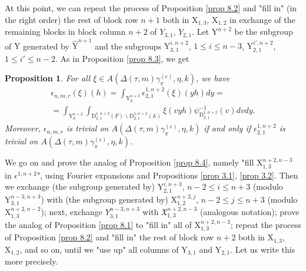 \documentclass[12pts]{amsart}
\newcommand{\BA}{{\mathbb {A}}}
\newtheorem{prop}[thm]{Proposition}
\begin{document}
At this point, we can repeat the process of Proposition \ref{prop
	8.2} and "fill in" (in the right order) the rest of block row $n+1$
both in $\mathrm{X}_{1,3}$, $\mathrm{X}_{1,2}$ in exchange of the
remaining blocks in block column $n+2$ of $Y_{3,1}$, $Y_{2,1}$. Let $\mathrm{Y}^{n+2}$ be the subgroup of $\mathrm{Y}$ generated by $\hat{\mathrm{Y}}^{n+1}$ and the subgroups $\mathrm{Y}_{3,1}^{i,n+2}$, $1\leq i\leq n-3$, $\mathrm{Y}_{2,1}^{i',n+2}$, $1\leq i'\leq n-2$.
As in Proposition \ref{prop 8.3}, we get
\begin{prop}\label{prop 8.3.1}
	For all $\xi\in A(\Delta(\tau,m)\gamma_\pi^{(\epsilon)},\eta,k)$, we have
	\begin{multline}\label{8.27.4}
	\epsilon_{n,m,r}(\xi)(h)=\int_{\mathrm{Y}^{n+2}_\BA}\epsilon_{2,1}^{1,n+2}(\xi)(yh)dy
	=\\
	=\int_{\mathrm{Y}^{n+2}_\BA}\int_{\mathrm{D}_{2,1}^{1,n+2}(F)\backslash \mathrm{D}_{2,1}^{1,n+2}(\BA)}\xi(vyh)\psi^{-1}_{\mathrm{D}_{2,1}^{1,n+2}}(v)dvdy.
	\end{multline}
	Moreover, $\epsilon_{n,m,r}$ is trivial on
	$A(\Delta(\tau,m)\gamma_\pi^{(\epsilon)},\eta,k)$ if and only if $\epsilon_{2,1}^{1,n+2}$ is trivial on 	$A(\Delta(\tau,m)\gamma_\pi^{(\epsilon)},\eta,k)$.
\end{prop}

We go on and prove
the analog of Proposition \ref{prop 8.4}, namely "fill $\mathrm{X}_{1,3}^{n+2,n-3}$ in $\epsilon^{1,n+2}$", using Fourier
expansions and Propositions \ref{prop 3.1}, \ref{prop 3.2}.
Then we exchange (the subgroup
generated by) $\mathrm{Y}_{2,1}^{i,n+3}$, $n-2\leq i\leq n+3$
(modulo $\mathrm{Y}_{3,1}^{n-3,n+3}$) with (the subgroup generated
by) $\mathrm{X}_{1,2}^{n+2,j}$, $n-2\leq j\leq n+3$ (modulo
$\mathrm{X}_{1,3}^{n+2,n-2}$); next, exchange $Y_{3,1}^{n-3,n+3}$ with
$\mathfrak{X}_{1,3}^{n+2,n-3}$ (analogous notation); prove the
analog of Proposition \ref{prop 8.1} to "fill in" all of
$\mathrm{X}_{1,3}^{n+2,n-3}$; repeat the process of Proposition
\ref{prop 8.2} and "fill in" the rest of block row $n+2$ both in
$\mathrm{X}_{1,3}$, $\mathrm{X}_{1,2}$, and so on, until we "use up"
all columns of $\mathrm{Y}_{3,1}$ and $\mathrm{Y}_{2,1}$. Let us
write this more precisely.
\end{document}
